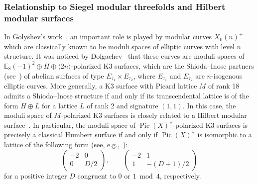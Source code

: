 \documentclass[10pt]{amsart}
\numberwithin{equation}{section}
\theoremstyle{plain}
\theoremstyle{definition}
\theoremstyle{remark}
\DeclareMathOperator{\Pic}{Pic}
\begin{document}
\subsubsection{Relationship to Siegel modular threefolds and Hilbert modular surfaces}\label{subsubsection:siegel-hilbert} In Golyshev's work~\cite{golyshev2004modularity,golyshev2007classification}, an important role is played by modular curves \(X_0(n)^+\) which are classically known to be moduli spaces of elliptic curves with level \(n\) structure. It was noticed by Dolgachev~\cite{dolgachev1996mirror} that these curves are moduli spaces of \(\mathbb{E}_8(-1)^2 \oplus H \oplus \langle 2n \rangle\)-polarized K3 surfaces, which are the Shioda--Inose partners (see~\cite{morrison1984k3}) of abelian surfaces of type \(E_{\tau_1} \times E_{\tau_2}\), where \(E_{\tau_1}\) and \(E_{\tau_2}\) are \(n\)-isogenous elliptic curves. More generally, a K3 surface with Picard lattice \(M\) of rank 18 admits a Shioda--Inose structure if and only if its transcendental lattice is of the form \(H \oplus L\) for a lattice \(L\) of rank 2 and signature \((1,1)\). In this case, the moduli space of \(M\)-polarized K3 surfaces is closely related to a Hilbert modular surface~\cite{harder2011moduli}. In particular, the moduli space of \(\Pic(X)^\vee\)-polarized K3 surfaces is precisely a classical Humbert surface if and only if \(\Pic(X)^\vee\) is isomorphic to a lattice of the following form (see, e.g.,~\cite{elkies2014k3}):
\begin{equation}\label{equation:kelkies}
  \left(\begin{matrix}-2 & 0 \\ 0 & D/2 \end{matrix} \right),\qquad \left(\begin{matrix}-2 & 1 \\ 1 & -(D+1)/2 \end{matrix} \right)
\end{equation}
for a positive integer \(D\) congruent to \(0\) or \(1 \bmod 4\), respectively.
\end{document}
